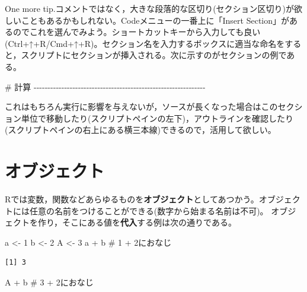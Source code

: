 \documentclass[
  a4paper,
]{ltjsbook}
\newenvironment{Shaded}{\begin{snugshade}}{\end{snugshade}}
\newcommand{\CommentTok}[1]{\textcolor[rgb]{0.37,0.37,0.37}{#1}}
\newcommand{\DecValTok}[1]{\textcolor[rgb]{0.68,0.00,0.00}{#1}}
\newcommand{\NormalTok}[1]{\textcolor[rgb]{0.00,0.23,0.31}{#1}}
\newcommand{\OtherTok}[1]{\textcolor[rgb]{0.00,0.23,0.31}{#1}}
\newcommand{\SpecialCharTok}[1]{\textcolor[rgb]{0.37,0.37,0.37}{#1}}
\begin{document}
One more
tip.コメントではなく，大きな段落的な区切り(セクション区切り)が欲しいこともあるかもしれない。Codeメニューの一番上に「Insert
Section」があるのでこれを選んでみよう。ショートカットキーから入力しても良い(Ctrl+↑+R/Cmd+↑+R)。セクション名を入力するボックスに適当な命名をすると，スクリプトにセクションが挿入される。次に示すのがセクションの例である。

\begin{Shaded}
\begin{Highlighting}[]
\CommentTok{\# 計算 {-}{-}{-}{-}{-}{-}{-}{-}{-}{-}{-}{-}{-}{-}{-}{-}{-}{-}{-}{-}{-}{-}{-}{-}{-}{-}{-}{-}{-}{-}{-}{-}{-}{-}{-}{-}{-}{-}{-}{-}{-}{-}{-}{-}{-}{-}{-}{-}{-}{-}{-}{-}{-}{-}{-}{-}{-}{-}{-}{-}{-}{-}}
\end{Highlighting}
\end{Shaded}

これはもちろん実行に影響を与えないが，ソースが長くなった場合はこのセクション単位で移動したり(スクリプトペインの左下)，アウトラインを確認したり(スクリプトペインの右上にある横三本線)できるので，活用して欲しい。

\section{オブジェクト}\label{ux30aaux30d6ux30b8ux30a7ux30afux30c8}

Rでは変数，関数などあらゆるものを\textbf{オブジェクト}としてあつかう。オブジェクトには任意の名前をつけることができる(数字から始まる名前は不可)。
オブジェクトを作り，そこにある値を\textbf{代入}する例は次の通りである。

\begin{Shaded}
\begin{Highlighting}[]
\NormalTok{a }\OtherTok{\textless{}{-}} \DecValTok{1}
\NormalTok{b }\OtherTok{\textless{}{-}} \DecValTok{2}
\NormalTok{A }\OtherTok{\textless{}{-}} \DecValTok{3}
\NormalTok{a }\SpecialCharTok{+}\NormalTok{ b }\CommentTok{\# 1 + 2におなじ}
\end{Highlighting}
\end{Shaded}

\begin{verbatim}
[1] 3
\end{verbatim}

\begin{Shaded}
\begin{Highlighting}[]
\NormalTok{A }\SpecialCharTok{+}\NormalTok{ b }\CommentTok{\# 3 + 2におなじ}
\end{Highlighting}
\end{Shaded}
\end{document}
